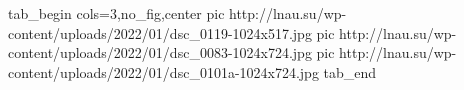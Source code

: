  
 
 
 
 


\ifcmt
  tab_begin cols=3,no_fig,center
     pic http://lnau.su/wp-content/uploads/2022/01/dsc_0119-1024x517.jpg
		 pic http://lnau.su/wp-content/uploads/2022/01/dsc_0083-1024x724.jpg
		 pic http://lnau.su/wp-content/uploads/2022/01/dsc_0101a-1024x724.jpg
  tab_end
\fi
